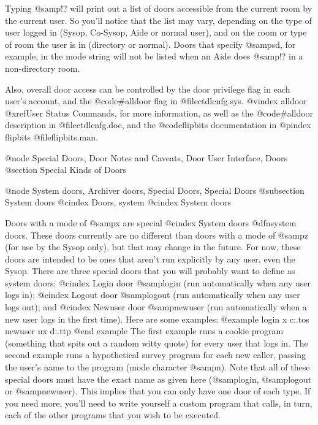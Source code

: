 {Typing @samp{!?} will print out a list of doors accessible from the
current room by the current user.  So you'll notice that the list may
vary, depending on the type of user logged in (Sysop, Co-Sysop, Aide or normal user),
and on the room or type of room the user is in (directory or normal).  Doors
that specify @samp{sd}, for example, in the mode string will not be listed when
an Aide does @samp{!?} in a non-directory room.

Also, overall door access can be controlled by the door privilege flag
in each user's account, and the @code{#alldoor} flag in @file{ctdlcnfg.sys}.
@vindex alldoor
@xref{User Status Commands},
for more information, as well as the @code{#alldoor} description in
@file{ctdlcnfg.doc}, and the @code{flipbits} documentation in
@pindex flipbits
@file{flipbits.man}.

@node Special Doors, Door Notes and Caveats, Door User Interface, Doors
@section Special Kinds of Doors

@node System doors, Archiver doors, Special Doors, Special Doors
@subsection System doors
@cindex Doors, system
@cindex System doors

Doors with a mode of @samp{x} are special
@cindex System doors
@dfn{system} doors.  These doors
currently are no different than doors with a mode of @samp{z} (for use
by the Sysop only), but that may change in the future.  For now,
these doors are intended to be ones that aren't run explicitly by
any user, even the Sysop.  There are three special doors that you
will probably want to define as system doors:
@cindex Login door
@samp{login} (run
automatically when any user logs in);
@cindex Logout door
@samp{logout} (run automatically
when any user logs out); and
@cindex Newuser door
@samp{newuser} (run automatically when a
new user logs in the first time).  Here are some examples:
@example
login   x       c:\bin\cookie.tos
newuser nx      d:\bbsprogs\survey.ttp
@end example
The first example runs a cookie program (something that spits out
a random witty quote) for every user that logs in.  The second
example runs a hypothetical survey program for each new caller,
passing the user's name to the program (mode character @samp{n}).
Note that all of these special doors must have the exact name as
given here (@samp{login}, @samp{logout} or @samp{newuser}).  This
implies that you
can only have one door of each type.  If you need more, you'll need
to write yourself a custom program that calls, in turn, each of the
other programs that you wish to be executed.

}
